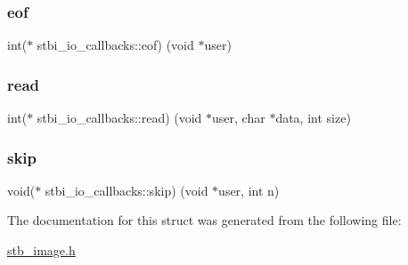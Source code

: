 \subsubsection{\texorpdfstring{eof}{eof}}
{\footnotesize\ttfamily int($\ast$ stbi\+\_\+io\+\_\+callbacks\+::eof) (void $\ast$user)}

\mbox{\label{structstbi__io__callbacks_a623e46b3a2a019611601409926283a88}} 
\subsubsection{\texorpdfstring{read}{read}}
{\footnotesize\ttfamily int($\ast$ stbi\+\_\+io\+\_\+callbacks\+::read) (void $\ast$user, char $\ast$data, int size)}

\mbox{\label{structstbi__io__callbacks_a257aac5480a90a6c4b8fbe86c1b01068}} 
\subsubsection{\texorpdfstring{skip}{skip}}
{\footnotesize\ttfamily void($\ast$ stbi\+\_\+io\+\_\+callbacks\+::skip) (void $\ast$user, int n)}



The documentation for this struct was generated from the following file\+:\begin{DoxyCompactItemize}
\item 
\mbox{\hyperlink{stb__image_8h}{stb\+\_\+image.\+h}}\end{DoxyCompactItemize}
